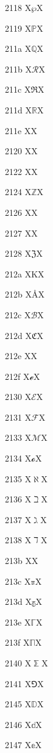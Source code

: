 \documentclass[11pt]{article}
\begin{document}
2118 X{\ensuremath{\wp}}X

2119 X{\ensuremath{\mathbb{P}}}X

211a X{\ensuremath{\mathbb{Q}}}X

211b X{\ensuremath{\mathscr{R}}}X

211c X{\ensuremath{\Re}}X

211d X{\ensuremath{\mathbb{R}}}X

211e X{\textrecipe}X

2120 X{\textservicemark}X

2122 X{\texttrademark}X

2124 X{\ensuremath{\mathbb{Z}}}X

2126 X{\textohm}X

2127 X{\textmho}X

2128 X{\ensuremath{\mathfrak{Z}}}X

212a X{K}X

212b X{\AA}X

212c X{\ensuremath{\mathscr{B}}}X

212d X{\ensuremath{\mathfrak{C}}}X

212e X{\textestimated}X

212f X{\ensuremath{\mathscr{e}}}X

2130 X{\ensuremath{\mathscr{E}}}X

2131 X{\ensuremath{\mathscr{F}}}X

2133 X{\ensuremath{\mathscr{M}}}X

2134 X{\ensuremath{\mathscr{o}}}X

2135 X{\ensuremath{\aleph}}X

2136 X{\ensuremath{\beth}}X

2137 X{\ensuremath{\gimel}}X

2138 X{\ensuremath{\daleth}}X

213b X{\fax}X

213c X{\ensuremath{\mathbb{\pi}}}X

213d X{\ensuremath{\mathbb{\gamma}}}X

213e X{\ensuremath{\mathbb{\Gamma}}}X

213f X{\ensuremath{\mathbb{\Pi}}}X

2140 X{\ensuremath{\mathbb{\sum}}}X

2141 X{\ensuremath{\Game}}X

2145 X{\ensuremath{\mathbb{D}}}X

2146 X{\ensuremath{\mathbb{d}}}X

2147 X{\ensuremath{\mathbb{e}}}X
\end{document}
